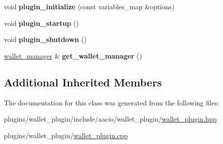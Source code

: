 \begin{DoxyCompactItemize}
\mbox{\label{classaacio_1_1wallet__plugin_a69f31a97faad3ef5f13c27329541c6e9}} 
void {\bfseries plugin\+\_\+initialize} (const variables\+\_\+map \&options)
\item 
\mbox{\label{classaacio_1_1wallet__plugin_a30bc8a99f5bf1f5ac18420999894dc42}} 
void {\bfseries plugin\+\_\+startup} ()
\item 
\mbox{\label{classaacio_1_1wallet__plugin_a8644ab5a7f69b1d60ee3c9ebf29504b9}} 
void {\bfseries plugin\+\_\+shutdown} ()
\item 
\mbox{\label{classaacio_1_1wallet__plugin_a5dabbb661cd7d85d06dbd6d3190409b8}} 
\mbox{\hyperlink{classaacio_1_1wallet_1_1wallet__manager}{wallet\+\_\+manager}} \& {\bfseries get\+\_\+wallet\+\_\+manager} ()
\end{DoxyCompactItemize}
\subsection*{Additional Inherited Members}


The documentation for this class was generated from the following files\+:\begin{DoxyCompactItemize}
\item 
plugins/wallet\+\_\+plugin/include/aacio/wallet\+\_\+plugin/\mbox{\hyperlink{wallet__plugin_8hpp}{wallet\+\_\+plugin.\+hpp}}\item 
plugins/wallet\+\_\+plugin/\mbox{\hyperlink{wallet__plugin_8cpp}{wallet\+\_\+plugin.\+cpp}}\end{DoxyCompactItemize}
